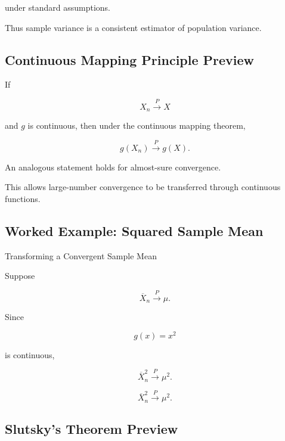 under standard assumptions.

Thus sample variance is a consistent estimator of population variance.

\subsection{Continuous Mapping Principle Preview}
\label{subsec:continuous-mapping-lln}

If

\[
X_n
\xrightarrow{P}
X
\]

and \(g\) is continuous, then under the continuous mapping theorem,

\[
\boxed{
g(X_n)
\xrightarrow{P}
g(X).
}
\]

An analogous statement holds for almost-sure convergence.

This allows large-number convergence to be transferred through
continuous functions.

\subsection{Worked Example: Squared Sample Mean}
\label{subsec:worked-continuous-mapping-lln}

\begin{workedexamplebox}{Transforming a Convergent Sample Mean}

Suppose

\[
\overline{X}_n
\xrightarrow{P}
\mu.
\]

Since

\[
g(x)=x^2
\]

is continuous,

\[
\overline{X}_n^2
\xrightarrow{P}
\mu^2.
\]

\begin{answerbox}
\[
\boxed{
\overline{X}_n^2
\xrightarrow{P}
\mu^2.
}
\]
\end{answerbox}

\end{workedexamplebox}

\subsection{Slutsky's Theorem Preview}
\label{subsec:slutsky-lln-preview}

